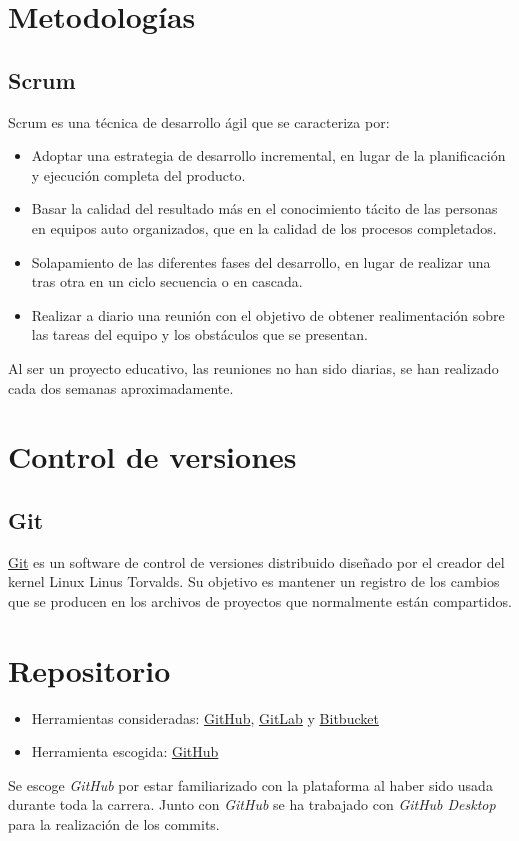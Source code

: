 
\section{Metodologías}\label{metodologias}
\subsection{Scrum}\label{scrum}
Scrum es una técnica de desarrollo ágil que se caracteriza por: \cite{wiki:Scrum_(desarrollo_de_software)}
\begin{itemize}
\tightlist
\item Adoptar una estrategia de desarrollo incremental, en lugar de la planificación y ejecución completa del producto.
\item Basar la calidad del resultado más en el conocimiento tácito de las personas en equipos auto organizados, que en la calidad de los procesos completados.
\item Solapamiento de las diferentes fases del desarrollo, en lugar de realizar una tras otra en un ciclo secuencia o en cascada.
\item Realizar a diario una reunión con el objetivo de obtener realimentación sobre las tareas del equipo y los obstáculos que se presentan.
\end{itemize}
Al ser un proyecto educativo, las reuniones no han sido diarias, se han realizado cada dos semanas aproximadamente.

\section{Control de versiones}\label{control-de-versiones}
\subsection{Git}\label{git}
\href{https://git-scm.com/}{Git} es un software de control de versiones distribuido diseñado por el creador del kernel Linux Linus Torvalds. Su objetivo es mantener un registro de los cambios que se producen en los archivos de proyectos que normalmente están compartidos.

\section{Repositorio}\label{repositorio}
\begin{itemize}
\tightlist
\item Herramientas consideradas: 
	\href{https://github.com/}{GitHub}, 
	\href{https://about.gitlab.com/}{GitLab} y
	\href{https://bitbucket.org/}{Bitbucket}
\item Herramienta escogida:
	\href{https://github.com/}{GitHub}
\end{itemize}
Se escoge \textit{GitHub} por estar familiarizado con la plataforma al haber sido usada durante toda la carrera. Junto con \textit{GitHub} se ha trabajado con \textit{GitHub Desktop} para la realización de los commits.

